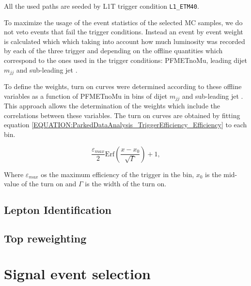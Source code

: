 All the used paths are seeded by \gls{L1T} trigger condition \verb!L1_ETM40!. 


To maximize the usage of the event statistics of the selected \gls{MC} samples, we do not veto events that fail the trigger conditions. Instead an event by event weight is calculated which which taking into account how much luminosity was recorded by each of the three trigger and depending on the offline quantities which correspond to the ones used in the trigger conditions: PFMETnoMu, leading dijet $m_{jj}$ and sub-leading jet \pt. 

To define the weights, turn on curves were determined according to these offline variables as a function of PFMETnoMu in bins of dijet $m_{jj}$ and sub-leading jet \pt. This approach allows the determination of the weights which include the correlations between these variables. The turn on curves are obtained by fitting equation \ref{EQUATION:ParkedDataAnalysis_TriggerEfficiency_Efficiency} to each bin.

\begin{equation}
\frac{\varepsilon_{max}}{2}\text{Erf}\left(\frac{x-x_{0}}{\sqrt{\Gamma}}\right)+1,
\label{EQUATION:ParkedDataAnalysis_TriggerEfficiency_Efficiency} 
\end{equation}

Where $\varepsilon_{max}$ os the maximum efficiency of the trigger in the bin, $x_{0}$ is the mid-value of the turn on and $\Gamma$ is the width of the turn on.

\subsection{Lepton Identification}

\subsection{Top reweighting}

\section{Signal event selection}

